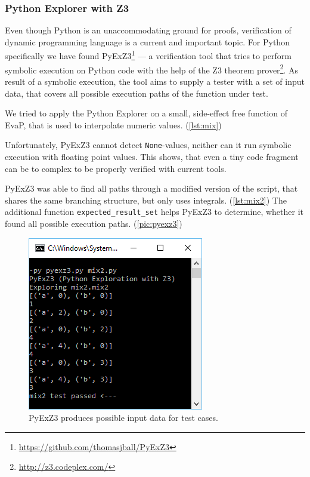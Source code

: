 \subsubsection{Python Explorer with Z3}

Even though Python is an unaccommodating ground for proofs, verification of dynamic programming language is a current and important topic.
For Python specifically we have found PyExZ3\footnote{\url{https://github.com/thomasjball/PyExZ3}} --- a verification tool that tries to perform symbolic execution on Python code with the help of the Z3 theorem prover\footnote{\url{http://z3.codeplex.com/}}.
As result of a symbolic execution, the tool aims to supply a tester with a set of input data, that covers all possible execution paths of the function under test.

We tried to apply the Python Explorer on a small, side-effect free function of EvaP, that is used to interpolate numeric values. (\autoref{lst:mix})

Unfortunately, PyExZ3 cannot detect \texttt{None}-values, neither can it run symbolic execution with floating point values.
This shows, that even a tiny code fragment can be to complex to be properly verified with current tools.





PyExZ3 was able to find all paths through a modified version of the script, that shares the same branching structure, but only uses integrals. (\autoref{lst:mix2})
The additional function \texttt{expected\_result\_set} helps PyExZ3 to determine, whether it found all possible execution paths. (\autoref{pic:pyexz3})

\begin{figure}
	\centering
	\includegraphics{graphics/PyExZ3-mix2}
	\caption{PyExZ3 produces possible input data for test cases.}
	\label{pic:pyexz3}
\end{figure}
